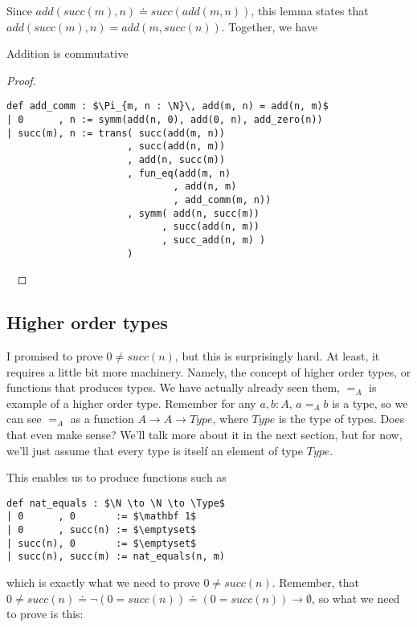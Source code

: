 \documentclass[a4paper, 12pt]{article}
\newcommand{\N}{\mathbb{N}}
\newcommand{\Type}{\mathit{Type}}
\theoremstyle{changedot}
\theoremstyle{changedotbreak}
\theoremstyle{nonumberplain}
\newtheorem{proof}{Proof}
\begin{document}
Since $add(succ(m), n) \doteq succ(add(m, n))$, this lemma states that $add(succ(m), n) = add(m, succ(n))$. Together, we have
\begin{theorem}\label{thm:add_comm}
  Addition is commutative
\end{theorem}
\begin{proof}~
\begin{lstlisting}[mathescape=true]
def add_comm : $\Pi_{m, n : \N}\, add(m, n) = add(n, m)$
| 0      , n := symm(add(n, 0), add(0, n), add_zero(n))
| succ(m), n := trans( succ(add(m, n))
                     , succ(add(n, m))
                     , add(n, succ(m))
                     , fun_eq(add(m, n)
                             , add(n, m)
                             , add_comm(m, n))
                     , symm( add(n, succ(m))
                           , succ(add(n, m))
                           , succ_add(n, m) )
                     )
\end{lstlisting}~
\end{proof}

\subsection{Higher order types}
I promised to prove $0 \neq succ(n)$, but this is surprisingly hard. At least, it requires a little bit more machinery. Namely, the concept of higher order types, or functions that produces types. We have actually already seen them, $=_{A}$ is example of a higher order type. Remember for any $a, b : A$, $a =_{A} b$ is a type, so we can see $=_{A}$ as a function $A \to A \to \mathit{Type}$, where $\mathit{Type}$ is the type of types. Does that even make sense? We'll talk more about it in the next section, but for now, we'll just assume that every type is itself an element of type $\mathit{Type}$.

This enables us to produce functions such as

\begin{lstlisting}[mathescape=true]
def nat_equals : $\N \to \N \to \Type$
| 0      , 0       := $\mathbf 1$
| 0      , succ(n) := $\emptyset$
| succ(n), 0       := $\emptyset$
| succ(n), succ(m) := nat_equals(n, m)
\end{lstlisting}

which is exactly what we need to prove $0 \neq succ(n)$. Remember, that $0 \neq succ(n) \doteq \neg(0 = succ(n)) \doteq (0 = succ(n)) \to \emptyset$, so what we need to prove is this:
\end{document}
